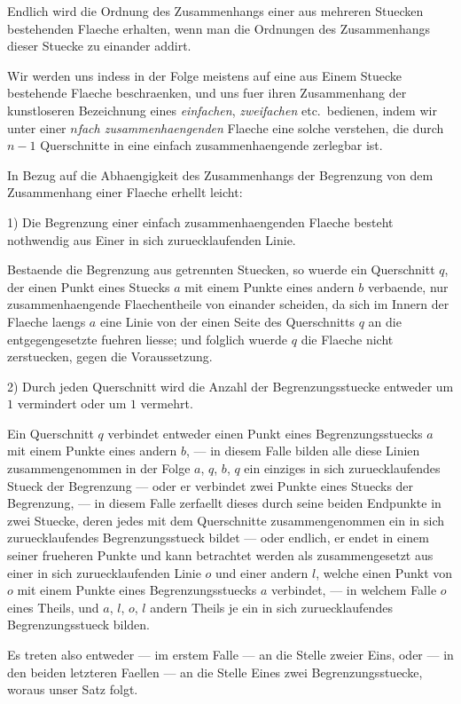\documentclass[11pt,a4paper]{article}
\theoremstyle{plain}
\theoremstyle{definition}
\begin{document}
Endlich wird die Ordnung des Zusammenhangs einer aus mehreren Stuecken bestehenden Flaeche erhalten, wenn man die Ordnungen des Zusammenhangs dieser Stuecke zu einander addirt.

Wir werden uns indess in der Folge meistens auf eine aus Einem Stuecke bestehende Flaeche beschraenken, und uns fuer ihren Zusammenhang der kunstloseren Bezeichnung eines \emph{einfachen}, \emph{zweifachen} etc.\ bedienen, indem wir unter einer \emph{$n$fach zusammenhaengenden} Flaeche eine solche verstehen, die durch $n - 1$ Querschnitte in eine einfach zusammenhaengende zerlegbar ist.

In Bezug auf die Abhaengigkeit des Zusammenhangs der Begrenzung von dem Zusammenhang einer Flaeche erhellt leicht:

1) Die Begrenzung einer einfach zusammenhaengenden Flaeche besteht nothwendig aus Einer in sich zuruecklaufenden Linie.

Bestaende die Begrenzung aus getrennten Stuecken, so wuerde ein Querschnitt $q$, der einen Punkt eines Stuecks $a$ mit einem Punkte eines andern $b$ verbaende, nur zusammenhaengende Flaechentheile von einander scheiden, da sich im Innern der Flaeche laengs $a$ eine Linie von der einen Seite des Querschnitts $q$ an die entgegengesetzte fuehren liesse; und folglich wuerde $q$ die Flaeche nicht zerstuecken, gegen die Voraussetzung.

2) Durch jeden Querschnitt wird die Anzahl der Begrenzungsstuecke entweder um $1$ vermindert oder um $1$ vermehrt.

Ein Querschnitt $q$ verbindet entweder einen Punkt eines Begrenzungsstuecks $a$ mit einem Punkte eines andern $b$, --- in diesem Falle bilden alle diese Linien zusammengenommen in der Folge $a$, $q$, $b$, $q$ ein einziges in sich zuruecklaufendes Stueck der Begrenzung --- oder er verbindet zwei Punkte eines Stuecks der Begrenzung, --- in diesem Falle zerfaellt dieses durch seine beiden Endpunkte in zwei Stuecke, deren jedes mit dem Querschnitte zusammengenommen ein in sich zuruecklaufendes Begrenzungsstueck bildet --- oder endlich, er endet in einem seiner frueheren Punkte und kann betrachtet werden als zusammengesetzt aus einer in sich zuruecklaufenden Linie $o$ und einer andern $l$, welche einen Punkt von $o$ mit einem Punkte eines Begrenzungsstuecks $a$ verbindet, --- in welchem Falle $o$ eines Theils, und $a$, $l$, $o$, $l$ andern Theils je ein in sich zuruecklaufendes Begrenzungsstueck bilden.

Es treten also entweder --- im erstem Falle --- an die Stelle zweier Eins, oder --- in den beiden letzteren Faellen --- an die Stelle Eines zwei Begrenzungsstuecke, woraus unser Satz folgt.
\end{document}
